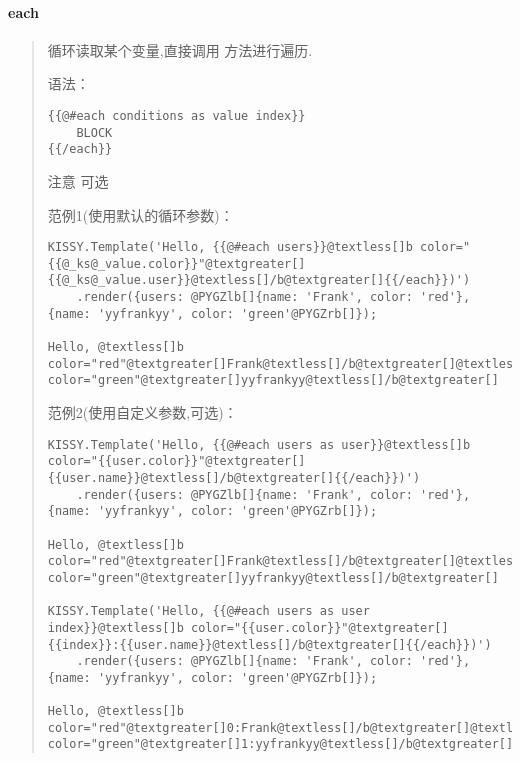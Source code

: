 \documentclass[letterpaper,10pt,english]{sphinxmanual}
\begin{document}
\paragraph{each}
\label{api/component/template/index:each}\begin{quote}

循环读取某个变量,直接调用  方法进行遍历.

语法：

\begin{Verbatim}[commandchars=@\[\]]
{{@#each conditions as value index}}
    BLOCK
{{/each}}
\end{Verbatim}

注意  可选

范例1(使用默认的循环参数)：

\begin{Verbatim}[commandchars=@\[\]]
KISSY.Template('Hello, {{@#each users}}@textless[]b color="{{@_ks@_value.color}}"@textgreater[]{{@_ks@_value.user}}@textless[]/b@textgreater[]{{/each}})')
    .render({users: @PYGZlb[]{name: 'Frank', color: 'red'}, {name: 'yyfrankyy', color: 'green'@PYGZrb[]});

Hello, @textless[]b color="red"@textgreater[]Frank@textless[]/b@textgreater[]@textless[]b color="green"@textgreater[]yyfrankyy@textless[]/b@textgreater[]
\end{Verbatim}

范例2(使用自定义参数,可选)：

\begin{Verbatim}[commandchars=@\[\]]
KISSY.Template('Hello, {{@#each users as user}}@textless[]b color="{{user.color}}"@textgreater[]{{user.name}}@textless[]/b@textgreater[]{{/each}})')
    .render({users: @PYGZlb[]{name: 'Frank', color: 'red'}, {name: 'yyfrankyy', color: 'green'@PYGZrb[]});

Hello, @textless[]b color="red"@textgreater[]Frank@textless[]/b@textgreater[]@textless[]b color="green"@textgreater[]yyfrankyy@textless[]/b@textgreater[]

KISSY.Template('Hello, {{@#each users as user index}}@textless[]b color="{{user.color}}"@textgreater[]{{index}}:{{user.name}}@textless[]/b@textgreater[]{{/each}})')
    .render({users: @PYGZlb[]{name: 'Frank', color: 'red'}, {name: 'yyfrankyy', color: 'green'@PYGZrb[]});

Hello, @textless[]b color="red"@textgreater[]0:Frank@textless[]/b@textgreater[]@textless[]b color="green"@textgreater[]1:yyfrankyy@textless[]/b@textgreater[]
\end{Verbatim}


\end{quote}
\end{document}
